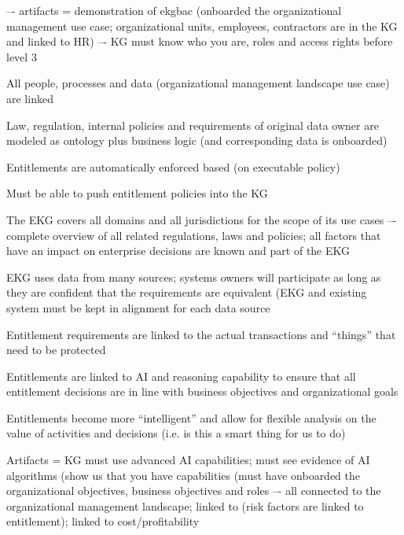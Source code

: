 \begin{scoring}

    \item {} –- artifacts = demonstration of \gls{ekgbac}
          (onboarded the organizational management use case; organizational units, employees, contractors are in
          the KG and linked to HR) –- KG must know who you are, roles and access rights before level 3
    \item All people, processes and data (organizational management landscape use case) are linked
    \item Law, regulation, internal policies and requirements of original data owner are modeled as ontology
          plus business logic (and corresponding data is onboarded)
    \item Entitlements are automatically enforced based (on executable policy)
    \item Must be able to push entitlement policies into the KG
    \item The EKG covers all domains and all jurisdictions for the scope of its use cases –-
          complete overview of all related regulations, laws and policies;
          all factors that have an impact on enterprise decisions are known and part of the EKG
    \item EKG uses data from many sources; systems owners will participate as long as they are confident that
          the requirements are equivalent (EKG and existing system must be kept in alignment for each data source
    \item Entitlement requirements are linked to the actual transactions and “things” that need to be protected

\end{scoring}

\kgmmscoringlevelFour

\begin{scoring}

  \item Entitlements are linked to AI and reasoning capability to ensure that all entitlement decisions are
        in line with business objectives and organizational goals
  \item Entitlements become more “intelligent” and allow for flexible analysis on the value of
        activities and decisions (i.e. is this a smart thing for us to do)
  \item Artifacts = KG must use advanced AI capabilities; must see evidence of AI algorithms
        (show us that you have  capabilities (must have onboarded the organizational objectives,
        business objectives and roles –- all connected to the organizational management landscape;
        linked to  (risk factors are linked to entitlement);
        linked to cost/profitability

\end{scoring}

